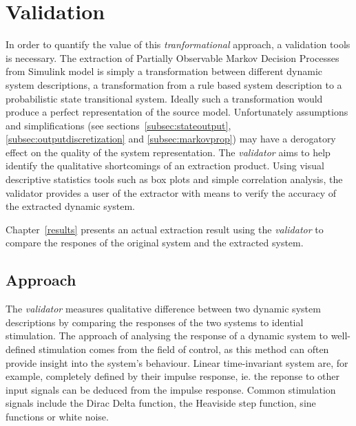 \section{Validation}
\label{validation}

In order to quantify the value of this \textit{tranformational} approach, a validation tools is necessary. The extraction of Partially Observable Markov Decision Processes from Simulink model is simply a transformation between different dynamic system descriptions, a transformation from a rule based system description to a probabilistic state transitional system. Ideally such a transformation would produce a perfect representation of the source model. Unfortunately assumptions and simplifications (see sections~\ref{subsec:stateoutput}, \ref{subsec:outputdiscretization} and \ref{subsec:markovprop}) may have a derogatory effect on the quality of the system representation. The \textit{validator} aims to help identify the qualitative shortcomings of an extraction product. Using visual descriptive statistics tools such as box plots and simple correlation analysis, the validator provides a user of the extractor with means to verify the accuracy of the extracted dynamic system.

Chapter~\ref{results} presents an actual extraction result using the \textit{validator} to compare the respones of the original system and the extracted system.



\subsection{Approach}

The \textit{validator} measures qualitative difference between two dynamic system descriptions by comparing the responses of the two systems to idential stimulation. The approach of analysing the response of a dynamic system to well-defined stimulation comes from the field of control, as this method can often provide insight into the system's behaviour. Linear time-invariant system are, for example, completely defined by their impulse response, ie. the reponse to other input signals can be deduced from the impulse response. Common stimulation signals include the Dirac Delta function, the Heaviside step function, sine functions or white noise.

